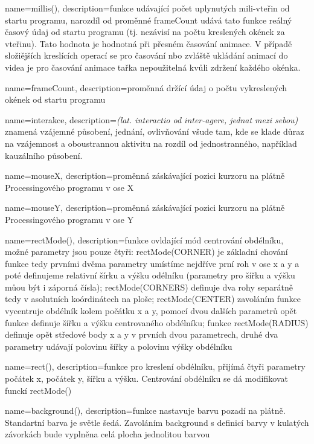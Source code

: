 {
  name={millis()},
  description={funkce udávající počet uplynutých mili-vteřin od startu programu, narozdíl od proměnné frameCount udává tato funkce reálný časový údaj od startu programu (tj. nezávisí na počtu kreslených okének za vteřinu). Tato hodnota je hodnotná při přesném časování animace. V případě složiějších kreslících operací se pro časování nbo zvláště ukládání animací do videa je pro časování animace tařka nepoužitelná kvůli zdržení každého okénka.}
}

{
  name={frameCount},
  description={proměnná držící údaj o počtu vykreslených okének od startu programu}
}

{
  name={interakce},
  description={{\em (lat. interactio od inter-agere, jednat mezi sebou)} znamená vzájemné působení, jednání, ovlivňování všude tam, kde se klade důraz na vzájemnost a oboustrannou aktivitu na rozdíl od jednostranného, například kauzálního působení.}
}

{
  name={mouseX},
  description={proměnná záskávající pozici kurzoru na plátně Processingového programu v ose X}
}

{
  name={mouseY},
  description={proměnná záskávající pozici kurzoru na plátně Processingového programu v ose Y}
}

{
  name={rectMode()},
  description={funkce ovldající mód centrování obdélníku, možné parametry jsou pouze čtyři:  rectMode(CORNER) je základní chování funkce  tedy prvními dvěma parametry umístíme nejdříve prní roh v ose x a y a poté definujeme relativní šírku a výšku odélníku (parametry pro šířku a výšku můou být i záporná čísla); rectMode(CORNERS) definuje dva rohy separátně tedy v asolutních koórdinátech na ploše; rectMode(CENTER) zavoláním funkce  vycentruje obdélník kolem počátku x a y, pomocí dvou dalších parametrů opět funkce  definuje šířku a výšku centrovaného obdélníku; funkce rectMode(RADIUS) definuje opět středové body x a y v prvních dvou parametrech, druhé dva parametry udávají polovinu šířky a polovinu výšky obdélníku}
}

{
  name={rect()},
  description={funkce pro kreslení obdélníku, přijímá čtyři parametry počátek x, počátek y, šířku a výšku. Centrování obdélníku se dá modifikovat funckí rectMode()}
}

{
  name={background()},
  description={funkce nastavuje barvu pozadí na plátně. Standartní barva je světle šedá. Zavoláním background s definicí barvy v kulatých závorkách bude vyplněna celá plocha jednolitou barvou}
}


